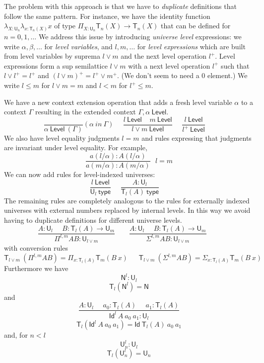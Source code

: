 \documentclass[11pt,a4paper]{article}
\theoremstyle{definition}
\newcommand{\Id}{\mathsf{Id}}
\newcommand{\NN}{\mathsf{N}}
\newcommand{\UU}{\mathsf{U}}
\newcommand{\Level}{\mathsf{Level}}
\newcommand{\type}{\mathsf{type}}
\newcommand{\mypi}[3]{\Pi_{#1:#2}#3}
\newcommand{\mylam}[3]{\lambda_{#1:#2}#3}
\newcommand{\mysig}[3]{\Sigma_{#1:#2}#3}
\newcommand{\T}{\mathsf{T}}
\begin{document}
The problem with this approach is that we have to {\em duplicate} definitions that follow
the same pattern. For instance, we have the identity function $\mylam{X}{\UU_n}{\mylam{x}{\T_n(X)}{x}}$
of type $\mypi{X}{\UU_n}{\T_n(X)\rightarrow \T_n(X)}$ that can be defined for $n = 0,1,\dots$
We address this issue by introducing {\em universe level}
expressions: we write $\alpha,\beta,\dots$
for {\em level variables}, and $l,m,\dots$ for {\em level expressions} which are built from level variables
by suprema $l \vee m$ and the next level operation $l^+$.
Level expressions form a sup semilattice $l\vee m$
with a next level operation $l^+$ such that $l \vee l^+ = l^+$
and $(l\vee m)^+ = l^+\vee m^+$. (We don't seem to need a $0$ element.)
We write $l\leqslant m$ for $l\vee m = m$ and $l<m$ for $l^+\leqslant m$.


We have a new context extension operation that adds a fresh level variable $\alpha$ to a context $\Gamma$ resulting in the extended context $\Gamma,\alpha~\Level$.
$$
\frac{}{\alpha~\Level~(\Gamma)}(\alpha~in~\Gamma)~~~~~~
\frac{l~\Level~~~~~m~\Level}{l\vee m~\Level}~~~~~~
\frac{l~\Level}{l^+~\Level}~~~~~~
$$
We also have level equality judgments $l = m$ and rules expressing that judgments are invariant under level equality.
For example,
$$
\frac{a(l/\alpha) : A(l/\alpha)}
{a(m/\alpha) : A(m/\alpha)}{~~~l=m}
$$
We can  now add rules for level-indexed universes:
$$
\frac{l~\Level}{\UU_{l}~\type}~~~~~~
\frac{A:\UU_{l}}{\T_{l}(A)~\type}~~~~~~
$$
The remaining rules are completely analogous to the rules for externally indexed universes with external numbers replaced by internal levels. In this way we avoid having to duplicate definitions for different universe levels.
$$
\frac{A:\UU_{l}~~~~~~B:\T_{l}(A)\rightarrow \UU_{m}}
     {\Pi^{l,m} A B:\UU_{l\vee m}}~~~~~~~~~
\frac{A:\UU_{l}~~~~~~B:\T_{l}(A)\rightarrow \UU_{m}}
     {\Sigma^{l,m} A B:\UU_{l\vee m}}~~~~~~~~~
$$
with conversion rules
$$
\T_{l\vee m}~(\Pi^{l,m} A B) = \mypi{x}{\T_{l}(A)}{ \T_{m}(B~x)}~~~~~~~
\T_{l\vee m}~(\Sigma^{l,m} A B) = \mysig{x}{\T_{l}(A)}{ \T_{m}(B~x)}~~~~~~~
$$
Furthermore we have $$\NN^{l}:\UU_{l}$$
$$\T_{l}(\NN^{l}) = \NN$$
and
$$
\frac{A:\UU_l~~~~~~a_0:\T_l(A)~~~~~~a_1:\T_l(A)}
{\Id^l~A~a_0~a_1:\UU_l}
$$
$$\T_l(\Id^l~A~a_0~a_1) = \Id~\T_l(A)~a_0~a_1$$
and, for $n<l$
$${\UU_n^{l}}:\UU_{l}$$
$$\T_{l}({\UU_n^{l}}) = \UU_{n}$$
\end{document}
